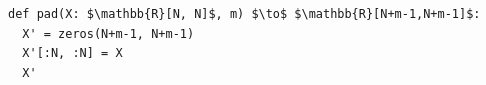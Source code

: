 \documentclass[border=10pt]{standalone}
\begin{document}
\begin{lstlisting}
def pad(X: $\mathbb{R}[N, N]$, m) $\to$ $\mathbb{R}[N+m-1,N+m-1]$:
  X' = zeros(N+m-1, N+m-1)
  X'[:N, :N] = X
  X'
\end{lstlisting}
\end{document}
